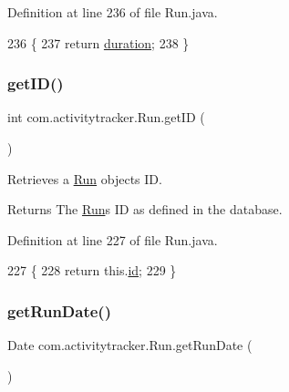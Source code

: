 Definition at line 236 of file Run.\+java.


\begin{DoxyCode}
236                                \{
237         \textcolor{keywordflow}{return} \mbox{\hyperlink{classcom_1_1activitytracker_1_1_run_a5e38d293d29d4b65c9290ff4bee82e03}{duration}};
238     \}
\end{DoxyCode}
\mbox{\label{classcom_1_1activitytracker_1_1_run_a61916c14ab5a2bf6b080200f7d0c5566}} 
\subsubsection{\texorpdfstring{get\+I\+D()}{getID()}}
{\footnotesize\ttfamily int com.\+activitytracker.\+Run.\+get\+ID (\begin{DoxyParamCaption}{ }\end{DoxyParamCaption})}

Retrieves a \mbox{\hyperlink{classcom_1_1activitytracker_1_1_run}{Run}} object\textquotesingle{}s ID.

\begin{DoxyReturn}{Returns}
The \mbox{\hyperlink{classcom_1_1activitytracker_1_1_run}{Run}}\textquotesingle{}s ID as defined in the database. 
\end{DoxyReturn}


Definition at line 227 of file Run.\+java.


\begin{DoxyCode}
227                        \{
228         \textcolor{keywordflow}{return} this.\mbox{\hyperlink{classcom_1_1activitytracker_1_1_run_aa76717aee690b5bfe919d6e87dea1d84}{id}};
229     \}
\end{DoxyCode}
\mbox{\label{classcom_1_1activitytracker_1_1_run_a3673ace303ad8026cdc80a6d6e7e3533}} 
\subsubsection{\texorpdfstring{get\+Run\+Date()}{getRunDate()}}
{\footnotesize\ttfamily Date com.\+activitytracker.\+Run.\+get\+Run\+Date (\begin{DoxyParamCaption}{ }\end{DoxyParamCaption})}

